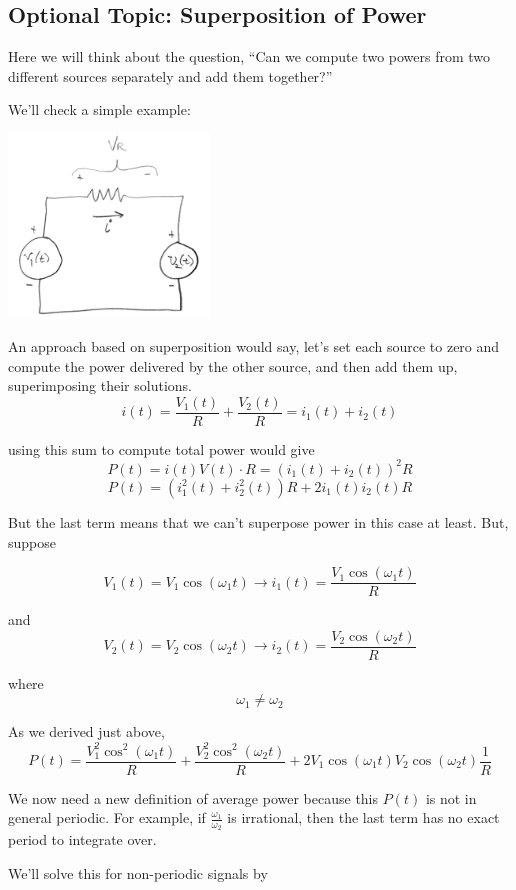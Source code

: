 \subsection{Optional Topic: Superposition of Power}

Here we will think about the question, ``Can we compute
two powers from two different sources separately and add them together?''

We'll check a simple example:

%
\includegraphics[width=0.4\textwidth]{figsChapt03/GP15083.png}



An approach based on superposition would say, let's set each
source to zero and compute the power delivered by the other source,
and then add them up, superimposing their solutions.
\[
i(t) = \frac{V_1(t)}{R} + \frac{V_2(t)}{R} = i_1(t) + i_2(t)
\]

using this sum to compute total power would give
\[
P(t) = i(t) V(t) \cdot R
= \left( i_1(t) + i_2(t) \right)^2 R
\]
\[
P(t) = \left( i_1^2(t) + i_2^2(t) \right) R + 2i_1(t) i_2(t) R
\]

But the last term means that we can't superpose power in this case at least.
But, suppose

\[
V_1(t) = V_1 \cos(\omega_1 t) \rightarrow i_1(t) = \frac{V_1 \cos(\omega_1 t)}{R}
\]

and
\[
V_2(t) = V_2 \cos(\omega_2 t) \rightarrow i_2(t) = \frac{V_2 \cos(\omega_2 t)}{R}
\]


where
\[
\omega_1 \neq \omega_2
\]

As we derived just above,
\[
P(t) = \frac{V_1^2 \cos^2(\omega_1 t)}{R} + \frac{V_2^2 \cos^2(\omega_2 t)}{R} + 2V_1 \cos(\omega_1 t) V_2 \cos(\omega_2 t) \frac{1}{R}
\]


We now need a new definition of average power because this $P(t)$ is not in general periodic.
For example, if $\frac{\omega_1}{\omega_2}$ is irrational, then the last term has no
exact period to integrate over.

We'll solve this for non-periodic signals  by

